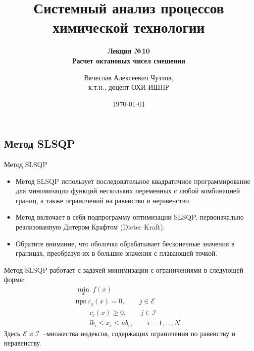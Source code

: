 \documentclass[aspectratio=169, mathserif]{beamer}%
\title{\LARGE{Системный анализ процессов химической технологии}}
\subtitle{\textcolor{tpugreen}{\textbf{Лекция №10}} \\ \textbf{Расчет октановых чисел смешения}}
\author[]{Вячеслав Алексеевич Чузлов, \\
к.т.н., доцент ОХИ ИШПР}
\date{\today}
\begin{document}

\titleframe%



\subsection{Метод SLSQP}
\begin{frame}[fragile, label=c]{Метод SLSQP}
\scriptsize
\begin{itemize}
\item Метод SLSQP использует последовательное квадратичное программирование для минимизации функций нескольких переменных с любой комбинацией границ, а также ограничений на равенство и неравенство.
\item Метод включает в себя подпрограмму оптимизации SLSQP, первоначально реализованную Дитером Крафтом (Dieter Kraft).
\item Обратите внимание, что оболочка обрабатывает бесконечные значения в границах, преобразуя их в большие значения с плавающей точкой.
\end{itemize}
\vfill
Метод SLSQP работает с задачей минимизации с ограничениями в следующей форме:
\vfill
\begin{equation}\label{eq:problem}
\begin{gathered}
\underset{x}{\min}\ f\left(x\right) \\
\mathrm{при }\ c_j\left(x\right) = 0, \qquad j \in \mathcal{E} \\
\qquad c_j\left(x\right) \geqslant 0, \qquad j \in \mathcal{I} \\
\qquad lb_i \leqslant x_i \leqslant ub_i, \qquad i = 1, \ldots , N.
\end{gathered}
\end{equation}
\vfill
Здесь $\mathcal{E}$ и $\mathcal{I}$~--множества индексов, содержащих ограничения по равенству и неравенству.
\vfill
\end{frame}
\end{document}
